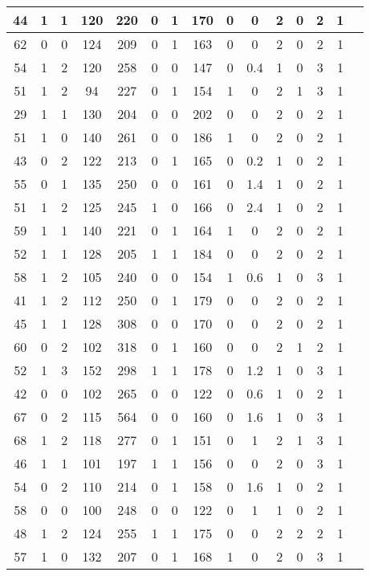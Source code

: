 \documentclass{article}
\begin{document}
\begin{longtable}{
|
c|c|c|c|c|c|c|c|c|c|c|c|c|c|c|}
\hline
44 & 1 & 1 & 120 & 220 & 0 & 1 & 170 & 0 & 0 & 2 & 0 & 2 & 1 \\
\hline
62 & 0 & 0 & 124 & 209 & 0 & 1 & 163 & 0 & 0 & 2 & 0 & 2 & 1 \\
\hline
54 & 1 & 2 & 120 & 258 & 0 & 0 & 147 & 0 & 0.4 & 1 & 0 & 3 & 1 \\
\hline
51 & 1 & 2 & 94 & 227 & 0 & 1 & 154 & 1 & 0 & 2 & 1 & 3 & 1 \\
\hline
29 & 1 & 1 & 130 & 204 & 0 & 0 & 202 & 0 & 0 & 2 & 0 & 2 & 1 \\
\hline
51 & 1 & 0 & 140 & 261 & 0 & 0 & 186 & 1 & 0 & 2 & 0 & 2 & 1 \\
\hline
43 & 0 & 2 & 122 & 213 & 0 & 1 & 165 & 0 & 0.2 & 1 & 0 & 2 & 1 \\
\hline
55 & 0 & 1 & 135 & 250 & 0 & 0 & 161 & 0 & 1.4 & 1 & 0 & 2 & 1 \\
\hline
51 & 1 & 2 & 125 & 245 & 1 & 0 & 166 & 0 & 2.4 & 1 & 0 & 2 & 1 \\
\hline
59 & 1 & 1 & 140 & 221 & 0 & 1 & 164 & 1 & 0 & 2 & 0 & 2 & 1 \\
\hline
52 & 1 & 1 & 128 & 205 & 1 & 1 & 184 & 0 & 0 & 2 & 0 & 2 & 1 \\
\hline
58 & 1 & 2 & 105 & 240 & 0 & 0 & 154 & 1 & 0.6 & 1 & 0 & 3 & 1 \\
\hline
41 & 1 & 2 & 112 & 250 & 0 & 1 & 179 & 0 & 0 & 2 & 0 & 2 & 1 \\
\hline
45 & 1 & 1 & 128 & 308 & 0 & 0 & 170 & 0 & 0 & 2 & 0 & 2 & 1 \\
\hline
60 & 0 & 2 & 102 & 318 & 0 & 1 & 160 & 0 & 0 & 2 & 1 & 2 & 1 \\
\hline
52 & 1 & 3 & 152 & 298 & 1 & 1 & 178 & 0 & 1.2 & 1 & 0 & 3 & 1 \\
\hline
42 & 0 & 0 & 102 & 265 & 0 & 0 & 122 & 0 & 0.6 & 1 & 0 & 2 & 1 \\
\hline
67 & 0 & 2 & 115 & 564 & 0 & 0 & 160 & 0 & 1.6 & 1 & 0 & 3 & 1 \\
\hline
68 & 1 & 2 & 118 & 277 & 0 & 1 & 151 & 0 & 1 & 2 & 1 & 3 & 1 \\
\hline
46 & 1 & 1 & 101 & 197 & 1 & 1 & 156 & 0 & 0 & 2 & 0 & 3 & 1 \\
\hline
54 & 0 & 2 & 110 & 214 & 0 & 1 & 158 & 0 & 1.6 & 1 & 0 & 2 & 1 \\
\hline
58 & 0 & 0 & 100 & 248 & 0 & 0 & 122 & 0 & 1 & 1 & 0 & 2 & 1 \\
\hline
48 & 1 & 2 & 124 & 255 & 1 & 1 & 175 & 0 & 0 & 2 & 2 & 2 & 1 \\
\hline
57 & 1 & 0 & 132 & 207 & 0 & 1 & 168 & 1 & 0 & 2 & 0 & 3 & 1 \\

\end{longtable}
\end{document}
